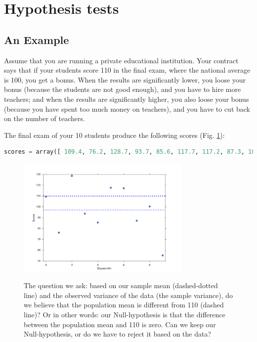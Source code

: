 \section{Hypothesis tests}\label{sec:hypotheses} 

\subsection{An Example}

Assume that you are running a private educational institution. Your contract says that if your students score 110 in the final exam, where the national average is 100, you get a bonus. When the results are significantly lower, you loose your bonus (because the students are not good enough), and you have to hire more teachers; and when the results are significantly higher, you also loose your bonus (because you have spent too much money on teachers), and you have to cut back on the number of teachers.

The final exam of your 10 students produce the following scores (Fig. \ref{fig:ExampleTtest}):

\begin{lstlisting}[language=Python]
  scores = array([ 109.4, 76.2, 128.7, 93.7, 85.6, 117.7, 117.2, 87.3, 100.3, 55.1])
\end{lstlisting}

\begin{figure}[ht]
  \centering
  \includegraphics[width=0.75\textwidth]{../Images/fig_ExampleTtest.png}\\
  \caption{The question we ask: based on our sample mean (dashed-dotted line) and the observed variance of the data (the sample variance), do we believe that the population mean is different from 110 (dashed line)? Or in other words: our Null-hypothesis is that the difference between the population mean and 110 is zero. Can we keep our Null-hypothesis, or do we have to reject it based on the data?}\label{fig:ExampleTtest}
\end{figure}

